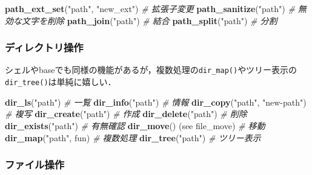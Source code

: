 \documentclass[
]{article}
\newenvironment{Shaded}{\begin{snugshade}}{\end{snugshade}}
\newcommand{\CommentTok}[1]{\textcolor[rgb]{0.56,0.35,0.01}{\textit{#1}}}
\newcommand{\FunctionTok}[1]{\textcolor[rgb]{0.13,0.29,0.53}{\textbf{#1}}}
\newcommand{\NormalTok}[1]{#1}
\newcommand{\StringTok}[1]{\textcolor[rgb]{0.31,0.60,0.02}{#1}}
\begin{document}
\begin{Shaded}
\begin{Highlighting}[]
\FunctionTok{path\_ext\_set}\NormalTok{(}\StringTok{"path"}\NormalTok{, }\StringTok{"new\_ext"}\NormalTok{)                     }\CommentTok{\# 拡張子変更   }
\FunctionTok{path\_sanitize}\NormalTok{(}\StringTok{"path"}\NormalTok{)                               }\CommentTok{\# 無効な文字を削除   }
\FunctionTok{path\_join}\NormalTok{(}\StringTok{"path"}\NormalTok{)                                   }\CommentTok{\# 結合}
\FunctionTok{path\_split}\NormalTok{(}\StringTok{"path"}\NormalTok{)                                  }\CommentTok{\# 分割}
\end{Highlighting}
\end{Shaded}

\hypertarget{ux30c7ux30a3ux30ecux30afux30c8ux30eaux64cdux4f5c}{%
\subsubsection{ディレクトリ操作}\label{ux30c7ux30a3ux30ecux30afux30c8ux30eaux64cdux4f5c}}

シェルやbaseでも同様の機能があるが，複数処理の\texttt{dir\_map()}やツリー表示の\texttt{dir\_tree()}は単純に嬉しい．

\begin{Shaded}
\begin{Highlighting}[]
\FunctionTok{dir\_ls}\NormalTok{(}\StringTok{"path"}\NormalTok{)               }\CommentTok{\# 一覧   }
\FunctionTok{dir\_info}\NormalTok{(}\StringTok{"path"}\NormalTok{)             }\CommentTok{\# 情報   }
\FunctionTok{dir\_copy}\NormalTok{(}\StringTok{"path"}\NormalTok{, }\StringTok{"new{-}path"}\NormalTok{) }\CommentTok{\# 複写   }
\FunctionTok{dir\_create}\NormalTok{(}\StringTok{"path"}\NormalTok{)           }\CommentTok{\# 作成   }
\FunctionTok{dir\_delete}\NormalTok{(}\StringTok{"path"}\NormalTok{)           }\CommentTok{\# 削除   }
\FunctionTok{dir\_exists}\NormalTok{(}\StringTok{"path"}\NormalTok{)           }\CommentTok{\# 有無確認   }
\FunctionTok{dir\_move}\NormalTok{() (see file\_move)   }\CommentTok{\# 移動   }
\FunctionTok{dir\_map}\NormalTok{(}\StringTok{"path"}\NormalTok{, fun)         }\CommentTok{\# 複数処理   }
\FunctionTok{dir\_tree}\NormalTok{(}\StringTok{"path"}\NormalTok{)             }\CommentTok{\# ツリー表示   }
\end{Highlighting}
\end{Shaded}

\hypertarget{ux30d5ux30a1ux30a4ux30ebux64cdux4f5c}{%
\subsubsection{ファイル操作}\label{ux30d5ux30a1ux30a4ux30ebux64cdux4f5c}}
\end{document}
